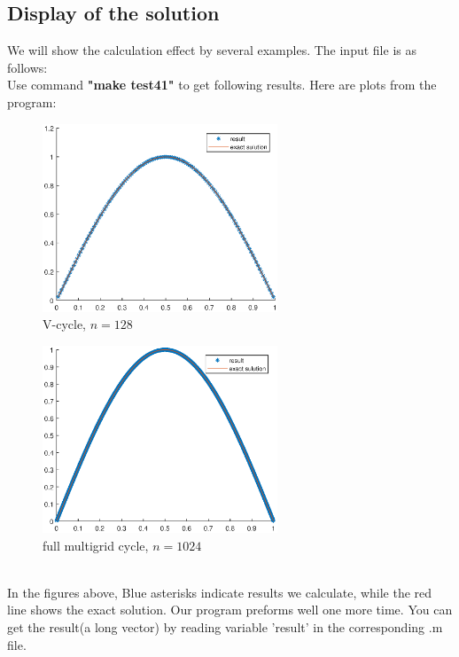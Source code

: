 \documentclass[a4paper,twocolumn]{article}
\theoremstyle{definition}
\begin{document}
\subsection{Display of the solution}
We will show the calculation effect by several examples. The input file is as follows:
\\
\newpage
Use command \textbf{"make test41"} to get following results. Here are plots from the program:
\begin{figure}[!htp]   
	\centering
	\includegraphics[width=7cm]{Pictures/F41_1.eps}
	\caption{V-cycle, $n = 128$}
\end{figure}
\begin{figure}[!htp]   
	\centering
	\includegraphics[width=7cm]{Pictures/F41_2.eps}
	\caption{full multigrid cycle, $n = 1024$}
\end{figure}\\
In the figures above, Blue asterisks indicate
results we calculate, while the red line shows the exact solution. Our program preforms well one more time. You can get the result(a long vector) by reading variable 'result' in the corresponding .m file.
\end{document}
